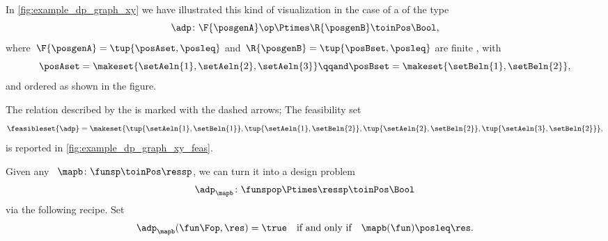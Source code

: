 \begin{marginfigure}
    \centering
    \caption{}
    \label{fig:example_dp_graph_xy}
\end{marginfigure}
\begin{marginfigure}
    \centering
    \caption{}
    \label{fig:example_dp_graph_xy_feas}
\end{marginfigure}

\begin{example}
    \label{exa:visualize-dp}
    In \cref{fig:example_dp_graph_xy} we have illustrated this kind of visualization in the case of a  of the type
    \begin{equation}
        \adp \colon \F{\posgenA} \op \Ptimes  \R{\posgenB} \toinPos \Bool,
    \end{equation}
    where~$\F{\posgenA} = \tup{\posAset, \posleq}$ and~$ \R{\posgenB} = \tup{\posBset, \posleq}$ are finite , with
    \begin{equation}
        \posAset = \makeset{ \setAeln{1}, \setAeln{2}, \setAeln{3} }
        \qqand
        \posBset =  \makeset{ \setBeln{1}, \setBeln{2}},
    \end{equation}
    and ordered as shown in the figure.

    The relation described by the  is marked with the dashed arrows;
    The feasibility set
    \begin{equation}
        \feasibleset{\adp} = \makeset{\tup{\setAeln{1}, \setBeln{1}}, \tup{\setAeln{1}, \setBeln{2}}, \tup{\setAeln{2}, \setBeln{2}}, \tup{\setAeln{3}, \setBeln{2}} },
    \end{equation}
    is reported in \cref{fig:example_dp_graph_xy_feas}.
\end{example}

\begin{remark}
    \label{re:dp-from-monotone}
    Given any ~$\mapb\colon \funsp \toinPos \ressp$, we can turn it into a design problem
    \begin{equation}
        \adp_\mapb \colon \funspop \Ptimes \ressp \toinPos \Bool
    \end{equation}
    via the following recipe.
    Set
    \begin{equation}
        \adp_\mapb (\fun\Fop, \res) = \true \quad \text{if and only if} \quad \mapb(\fun) \posleq \res.
    \end{equation}
\end{remark}

